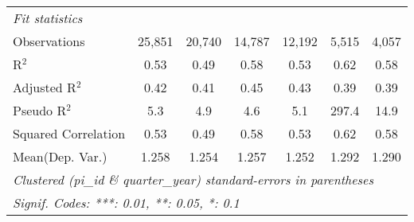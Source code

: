 \begin{tabular}{lcccccc}
   \midrule
   \emph{Fit statistics}\\
   Observations                                               & 25,851        & 20,740        & 14,787       & 12,192       & 5,515        & 4,057\\  
   R$^2$                                                      & 0.53          & 0.49          & 0.58         & 0.53         & 0.62         & 0.58\\  
   Adjusted R$^2$                                             & 0.42          & 0.41          & 0.45         & 0.43         & 0.39         & 0.39\\  
   Pseudo R$^2$                                               & 5.3           & 4.9           & 4.6          & 5.1          & 297.4        & 14.9\\  
   Squared Correlation                                        & 0.53          & 0.49          & 0.58         & 0.53         & 0.62         & 0.58\\  
Mean(Dep. Var.) & 1.258 & 1.254 & 1.257 & 1.252 & 1.292 & 1.290 \\
   \midrule \midrule
   \multicolumn{7}{l}{\emph{Clustered (pi\_id \& quarter\_year) standard-errors in parentheses}}\\
   \multicolumn{7}{l}{\emph{Signif. Codes: ***: 0.01, **: 0.05, *: 0.1}}\\
\end{tabular}
\par\endgroup
